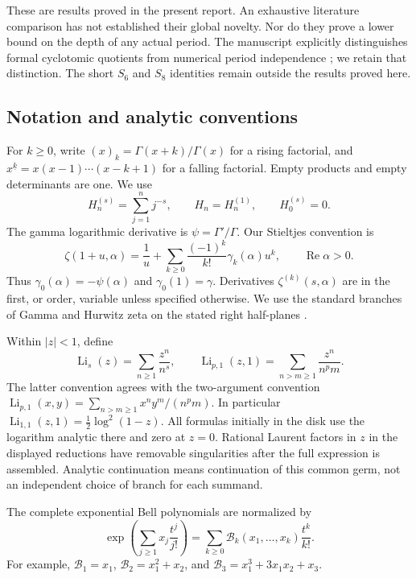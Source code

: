 \documentclass[11pt,letterpaper]{article}
\numberwithin{equation}{section}
\theoremstyle{definition}\newtheorem{definition}[theorem]{Definition}
\theoremstyle{remark}\newtheorem{remark}[theorem]{Remark}
\DeclareMathOperator{\Li}{Li}
\DeclareMathOperator{\Rea}{Re}
\newcommand{\fall}[2]{#1^{\underline{#2}}}
\newcommand{\Bell}{\mathcal B}
\begin{document}
These are results proved in the present report. An exhaustive literature
comparison has not established their global novelty. Nor do they prove
a lower bound on the depth of any actual period. The manuscript explicitly
distinguishes formal cyclotomic quotients from numerical period
independence \cite{repo:quotients}; we retain that distinction. The short
$S_6$ and $S_8$ identities remain outside the results proved here.

\subsection{Notation and analytic conventions}
For $k\geq0$, write $(x)_k=\Gamma(x+k)/\Gamma(x)$ for a rising
factorial, and $\fall{x}{k}=x(x-1)\cdots(x-k+1)$ for a falling factorial.
Empty products and empty determinants are one. We use
\[
 H_n^{(s)}=\sum_{j=1}^n j^{-s},\qquad H_n=H_n^{(1)},\qquad H_0^{(s)}=0.
\]
The gamma logarithmic derivative is $\psi=\Gamma'/\Gamma$. Our
Stieltjes convention is
\begin{equation}\label{dhr:eq:stieltjes-convention}
 \zeta(1+u,\alpha)=\frac1u+
 \sum_{k\geq0}\frac{(-1)^k}{k!}\gamma_k(\alpha)u^k,
 \qquad \Rea\alpha>0.
\end{equation}
Thus $\gamma_0(\alpha)=-\psi(\alpha)$ and $\gamma_0(1)=\gamma$.
Derivatives $\zeta^{(k)}(s,\alpha)$ are in the first, or order,
variable unless specified otherwise. We use the standard branches of
Gamma and Hurwitz zeta on the stated right half-planes
\cite{dlmf:gamma,dlmf:hurwitz,dlmf:polygamma}.

Within $|z|<1$, define
\begin{equation}\label{dhr:eq:polylogs}
 \Li_s(z)=\sum_{n\geq1}\frac{z^n}{n^s},\qquad
 \Li_{p,1}(z,1)=\sum_{n>m\geq1}\frac{z^n}{n^pm}.
\end{equation}
The latter convention agrees with the two-argument convention
$\Li_{p,1}(x,y)=\sum_{n>m\geq1}x^ny^m/(n^pm)$.
In particular $\Li_{1,1}(z,1)=\tfrac12\log^2(1-z)$. All formulas
initially in the disk use the logarithm analytic there and zero at
$z=0$. Rational Laurent factors in $z$ in the displayed reductions
have removable singularities after the full expression is assembled.
Analytic continuation means continuation of this common germ, not an
independent choice of branch for each summand.

The complete exponential Bell polynomials are normalized by
\begin{equation}\label{dhr:eq:bell}
 \exp\left(\sum_{j\geq1}x_j\frac{t^j}{j!}\right)
 =\sum_{k\geq0}\Bell_k(x_1,\ldots,x_k)\frac{t^k}{k!}.
\end{equation}
For example, $\Bell_1=x_1$, $\Bell_2=x_1^2+x_2$, and
$\Bell_3=x_1^3+3x_1x_2+x_3$.
\end{document}
